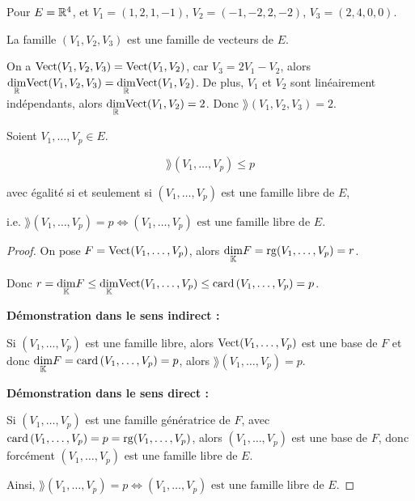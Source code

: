 \documentclass[12pt, a4paper]{report}
\begin{document}
\begin{example}
    Pour $E = \mathbb{R}^4$, et $V_1 = (1,2,1,-1)$, $V_2 = (-1,-2,2,-2)$, $V_3 = (2,4,0,0)$.

    La famille $(V_1,V_2,V_3)$ est une famille de vecteurs de $E$.

    On a $\mathrm{Vect}(V_1,V_2,V_3) = \mathrm{Vect}(V_1,V_2)$, car $V_3 = 2V_1 - V_2$, alors $\underset{\mathbb{R}}\dim \mathrm{Vect}(V_1,V_2,V_3) = \underset{\mathbb{R}}\dim \mathrm{Vect}(V_1,V_2)$. De plus, $V_1$ et $V_2$ sont linéairement indépendants, alors $\underset{\mathbb{R}}\dim \mathrm{Vect}(V_1,V_2) = 2$. Donc $\rang(V_1,V_2,V_3) = 2$.
\end{example}

\begin{property}
    Soient $V_1,\dots,V_p \in E$.
    
    $$\rang(V_1,\dots,V_p) \le p$$
    
    avec égalité si et seulement si $(V_1,\dots,V_p)$ est une famille libre de $E$,
    
    i.e. $\rang(V_1,\dots,V_p) = p \iff (V_1,\dots,V_p) \text{ est une famille libre de } E$.

    \label{prop:rang_famille_libre_iff_rang_egal_card}
\end{property}

\begin{proof}
    On pose $F = \mathrm{Vect}(V_1,\dots,V_p)$, alors $\underset{\mathbb{K}}\dim F = \mathrm{rg}(V_1,\dots,V_p) = r$.

    Donc $r = \underset{\mathbb{K}}\dim F \le \underset{\mathbb{K}}\dim \mathrm{Vect}(V_1,\dots,V_p) \le \mathrm{card}\left(V_1,\dots,V_p\right) = p$.

    \textbf{Démonstration dans le sens indirect : }

    Si $(V_1,\dots,V_p)$ est une famille libre, alors $\mathrm{Vect}(V_1,\dots,V_p)$ est une base de $F$ et donc $\underset{\mathbb{K}}\dim F = \mathrm{card}\left(V_1,\dots,V_p\right) = p$, alors $\rang(V_1,\dots,V_p) = p$.

    \textbf{Démonstration dans le sens direct : }

    Si $(V_1,\dots,V_p)$ est une famille génératrice de $F$, avec $\mathrm{card}\left(V_1,\dots,V_p\right) = p = \mathrm{rg}(V_1,\dots,V_p)$, alors $(V_1,\dots,V_p)$ est une base de $F$, donc forcément $(V_1,\dots,V_p)$ est une famille libre de $E$.

    Ainsi, $\rang(V_1,\dots,V_p) = p \iff (V_1,\dots,V_p) \text{ est une famille libre de } E$.
\end{proof}
\end{document}
